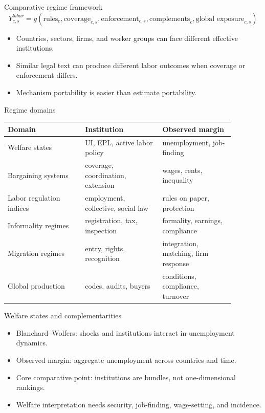 \documentclass[aspectratio=169,11pt]{beamer}
\begin{document}
\begin{frame}{Comparative regime framework}
\small
\[
Y^{labor}_{c,s}
= g(\text{rules}_{c}, \text{coverage}_{c,s}, \text{enforcement}_{c,s},
\text{complements}_{c}, \text{global exposure}_{c,s})
\]
\begin{itemize}
    \item Countries, sectors, firms, and worker groups can face different effective institutions.
    \item Similar legal text can produce different labor outcomes when coverage or enforcement differs.
    \item Mechanism portability is easier than estimate portability.
\end{itemize}
\end{frame}

\begin{frame}{Regime domains}
\small
\begin{tabular}{p{0.30\linewidth} p{0.30\linewidth} p{0.28\linewidth}}
\toprule
Domain & Institution & Observed margin \\
\midrule
Welfare states & UI, EPL, active labor policy & unemployment, job-finding \\
Bargaining systems & coverage, coordination, extension & wages, rents, inequality \\
Labor regulation indices & employment, collective, social law & rules on paper, protection \\
Informality regimes & registration, tax, inspection & formality, earnings, compliance \\
Migration regimes & entry, rights, recognition & integration, matching, firm response \\
Global production & codes, audits, buyers & conditions, compliance, turnover \\
\bottomrule
\end{tabular}
\end{frame}

\begin{frame}{Welfare states and complementarities}
\begin{itemize}
    \item Blanchard--Wolfers: shocks and institutions interact in unemployment dynamics.
    \item Observed margin: aggregate unemployment across countries and time.
    \item Core comparative point: institutions are bundles, not one-dimensional rankings.
    \item Welfare interpretation needs security, job-finding, wage-setting, and incidence.
\end{itemize}
\end{frame}
\end{document}
